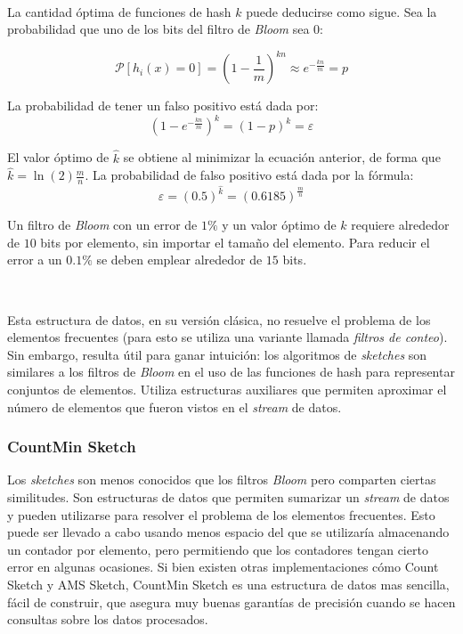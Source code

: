 \documentclass[a4paper,12pt, oneside]{article}
\begin{document}
\

La cantidad óptima de funciones de hash $k$ puede deducirse como sigue. Sea la probabilidad que uno de los bits del filtro de \textit{Bloom} sea 0:

\begin{equation}
	\mathcal{P} [h_i(x)=0 ] = (1- \frac{1}{m})^{kn} \approx e ^ {-\frac{kn}{m}} = p
\end{equation}

La probabilidad de tener un falso positivo está dada por:
\begin{equation}
	(1 - e ^ {-\frac{kn}{m}})^k = (1 - p)^k = \varepsilon
\end{equation}

El valor óptimo de $\hat{k}$ se obtiene al minimizar la ecuación anterior, de forma que $\hat{k} = \ln(2) \frac{m}{n}$. La probabilidad de falso positivo está dada por la fórmula\cite{Bloom:1970:STH:362686.362692}:
\begin{equation}
	\varepsilon = (0.5) ^ {\hat{k}} = (0.6185)^{\frac{m}{n}}
\end{equation}

Un filtro de \textit{Bloom} con un error de $1\%$ y un valor óptimo de $k$ requiere alrededor de $10$ bits por elemento, sin importar el tamaño del elemento. Para reducir el error a un $0.1\%$ se deben emplear alrededor de $15$ bits.

\

Esta estructura de datos, en su versión clásica, no resuelve el problema de los elementos frecuentes (para esto se utiliza una variante llamada \textit{filtros de conteo}). Sin embargo, resulta útil para ganar intuición: los algoritmos de \textit{sketches} son similares a los filtros de \textit{Bloom} en el uso de las funciones de hash para representar conjuntos de elementos. Utiliza estructuras auxiliares que permiten aproximar el número de elementos que fueron vistos en el \textit{stream} de datos.  

\subsubsection{CountMin Sketch}

Los \textit{sketches} son menos conocidos que los filtros \textit{Bloom} pero comparten ciertas similitudes. Son estructuras de datos que permiten sumarizar un \textit{stream} de datos y pueden utilizarse para resolver el problema de los elementos frecuentes. Esto puede ser llevado a cabo usando menos espacio del que se utilizaría almacenando un contador por elemento, pero permitiendo que los contadores tengan cierto error en algunas ocasiones. Si bien existen otras implementaciones cómo Count Sketch\cite{Charikar:2002:FFI:646255.684566} y AMS Sketch\cite{Alon:1996:SCA:237814.237823}, CountMin Sketch es una estructura de datos mas sencilla, fácil de construir, que asegura muy buenas garantías de precisión cuando se hacen consultas sobre los datos procesados.
\end{document}
